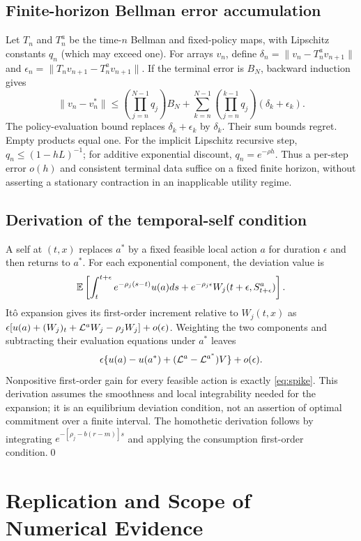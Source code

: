 \begin{appendix}
\subsection{Finite-horizon Bellman error accumulation}
Let $T_n$ and $T_n^a$ be the time-$n$ Bellman and fixed-policy maps, with Lipschitz constants $q_n$ (which may exceed one). For arrays $v_n$, define $\delta_n=\|v_n-T_n^av_{n+1}\|$ and $\epsilon_n=\|T_nv_{n+1}-T_n^av_{n+1}\|$. If the terminal error is $B_N$, backward induction gives
\[
 \|v_n-v_n^*\|\leq\left(\prod_{j=n}^{N-1}q_j\right)B_N
 +\sum_{k=n}^{N-1}\left(\prod_{j=n}^{k-1}q_j\right)(\delta_k+\epsilon_k).
\]
The policy-evaluation bound replaces $\delta_k+\epsilon_k$ by $\delta_k$. Their sum bounds regret. Empty products equal one. For the implicit Lipschitz recursive step, $q_n\leq(1-hL)^{-1}$; for additive exponential discount, $q_n=e^{-\rho h}$. Thus a per-step error $o(h)$ and consistent terminal data suffice on a fixed finite horizon, without asserting a stationary contraction in an inapplicable utility regime.

\subsection{Derivation of the temporal-self condition}
A self at $(t,x)$ replaces $a^*$ by a fixed feasible local action $a$ for duration $\epsilon$ and then returns to $a^*$. For each exponential component, the deviation value is
\[
 \mathbb E\left[\int_t^{t+\epsilon}e^{-\rho_j(s-t)}u(a)ds
     +e^{-\rho_j\epsilon}W_j(t+\epsilon,S_{t+\epsilon}^{a})\right].
\]
It\^o expansion gives its first-order increment relative to $W_j(t,x)$ as $\epsilon[u(a)+(W_j)_t+\mathcal L^aW_j-\rho_jW_j]+o(\epsilon)$. Weighting the two components and subtracting their evaluation equations under $a^*$ leaves
\[
 \epsilon\{u(a)-u(a^*)+(\mathcal L^a-\mathcal L^{a^*})V\}+o(\epsilon).
\]
Nonpositive first-order gain for every feasible action is exactly \eqref{eq:spike}. This derivation assumes the smoothness and local integrability needed for the expansion; it is an equilibrium deviation condition, not an assertion of optimal commitment over a finite interval. The homothetic derivation follows by integrating $e^{-[\rho_j-b(r-m)]s}$ and applying the consumption first-order condition.\qed



\section{Replication and Scope of Numerical Evidence}\label{app:replication}

\end{appendix}
